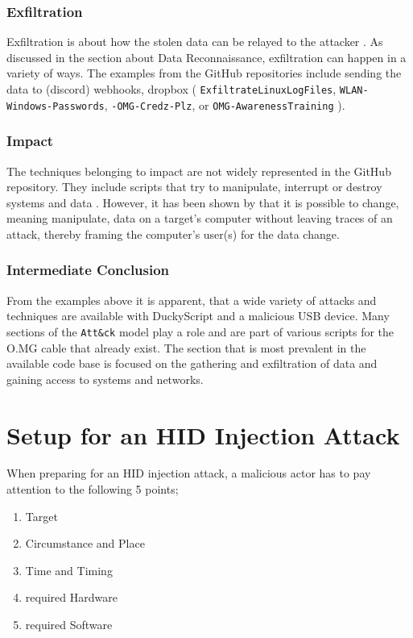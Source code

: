 \subsubsection{Exfiltration}

Exfiltration is about how the stolen data can be relayed to the attacker \cite{MITREATTCK}. As discussed in the section about Data Reconnaissance, exfiltration can happen in a variety of ways. The examples from the GitHub repositories include sending the data to (discord) webhooks, dropbox  ( \verb|ExfiltrateLinuxLogFiles|, \verb|WLAN-Windows-Passwords|, \verb|-OMG-Credz-Plz|, or \verb|OMG-AwarenessTraining|  \cite{OmgpayloadsPayloadsLibrary}).

\subsubsection{Impact}

The techniques belonging to impact are not widely represented in the GitHub repository. They include scripts that try to manipulate, interrupt or destroy systems and data \cite{MITREATTCK}. However, it has been shown by \cite{lawalFacilitatingCyberenabledFraud2022} that it is possible to change, meaning manipulate, data on a target's computer without leaving traces of an attack, thereby framing the computer's user(s) for the data change. 


\subsubsection{Intermediate Conclusion}

From the examples above it is apparent, that a wide variety of attacks and techniques are available with DuckyScript and a malicious USB device. Many sections of the \verb|Att&ck| model play a role and are part of various scripts for the O.MG cable that already exist. The section that is most prevalent in the available code base is focused on the gathering and exfiltration of data and gaining access to systems and networks. 


\section{Setup for an HID Injection Attack}

When preparing for an HID injection attack, a malicious actor has to pay attention to the following 5 points;
\begin{enumerate}
    \item Target
    \item Circumstance and Place
    \item Time and Timing
    \item required Hardware
    \item required Software
\end{enumerate}


